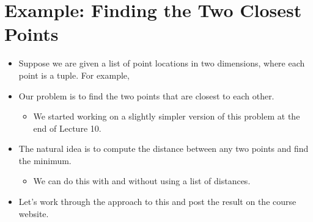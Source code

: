 \documentclass[letterpaper,10pt,english]{sphinxmanual}
\begin{document}
\section{Example: Finding the Two Closest Points}
\label{\detokenize{lecture_notes/lec12_loops2_for_double:example-finding-the-two-closest-points}}\begin{itemize}
\item {} 
Suppose we are given a list of point locations in two dimensions,
where each point is a tuple. For example,

%
\begin{sphinxVerbatim}[commandchars=\\\{\}]
  \PYG{p}{[}         \PYG{p}{]}
\end{sphinxVerbatim}

\item {} 
Our problem is to find the two points that are closest to each
other.
\begin{itemize}
\item {} 
We started working on a slightly simpler version of this problem
at the end of Lecture 10.

\end{itemize}

\item {} 
The natural idea is to compute the distance between any two points
and find the minimum.
\begin{itemize}
\item {} 
We can do this with and without using a list of distances.

\end{itemize}

\item {} 
Let’s work through the approach to this and post the result on the
course website.

\end{itemize}
\end{document}
